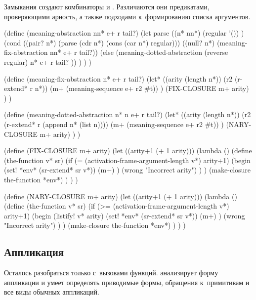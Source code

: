 Замыкания создают комбинаторы  и . Различаются
они предикатами, проверяющими арность, а также подходами к~формированию списка
аргументов.

\begin{code:lisp}
(define (meaning-abstraction nn* e+ r tail?)
  (let parse ((n* nn*)
              (regular '()) )
    (cond
     ((pair? n*) (parse (cdr n*) (cons (car n*) regular)))
     ((null? n*) (meaning-fix-abstraction nn* e+ r tail?))
     (else       (meaning-dotted-abstraction
                  (reverse regular) n* e+ r tail? )) ) ) )

(define (meaning-fix-abstraction n* e+ r tail?)
  (let* ((arity (length n*))
         (r2 (r-extend* r n*))
         (m+ (meaning-sequence e+ r2 #t)) )
    (FIX-CLOSURE m+ arity) ) )

(define (meaning-dotted-abstraction n* n e+ r tail?)
  (let* ((arity (length n*))
         (r2 (r-extend* r (append n* (list n))))
         (m+ (meaning-sequence e+ r2 #t)) )
    (NARY-CLOSURE m+ arity) ) )

(define (FIX-CLOSURE m+ arity)
  (let ((arity+1 (+ 1 arity)))
    (lambda ()
      (define (the-function v* sr)
        (if (= (activation-frame-argument-length v*) arity+1)
            (begin (set! *env* (sr-extend* sr v*))
                   (m+) )
            (wrong "Incorrect arity") ) )
      (make-closure the-function *env*) ) ) )

(define (NARY-CLOSURE m+ arity)
  (let ((arity+1 (+ 1 arity)))
    (lambda ()
      (define (the-function v* sr)
        (if (>= (activation-frame-argument-length v*) arity+1)
            (begin
              (listify! v* arity)
              (set! *env* (sr-extend* sr v*))
              (m+) )
            (wrong "Incorrect arity") ) )
      (make-closure the-function *env*) ) ) )
\end{code:lisp}


\subsection{Аппликация}\label{fast/dilute/ssect:application}

Осталось разобраться только с~вызовами функций. 
анализирует форму аппликации и умеет определять приводимые формы, обращения
к~примитивам и все виды обычных аппликаций.

